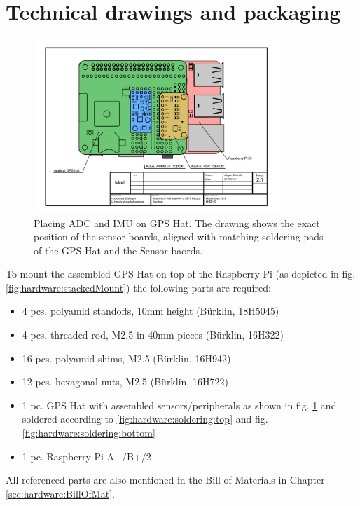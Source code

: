 \section{Technical drawings and packaging}
\label{sec:hardware:techDrawAndPack}

\begin{figure}[H]
    \centering
    \includegraphics[angle=90,width=0.83\textwidth]{fig/ch-rpi-hardware/A4_tech_draw_topview_sensor_mountingPositions}
    \caption[Placing ADC and IMU on GPS Hat]{Placing ADC and IMU on GPS Hat. The drawing shows the exact position of the sensor boards, aligned with matching soldering pads of the GPS Hat and the Sensor baords.}
    \label{fig:hardware:sensorMount}
\end{figure}

To mount the assembled GPS Hat on top of the Raspberry Pi (as depicted in fig. \ref{fig:hardware:stackedMount}) the following parts are required:
\begin{itemize}
	\item 4 pcs. polyamid standoffs, 10mm height (B\"urklin, 18H5045)
	\item 4 pcs. threaded rod, M2.5 in 40mm pieces (B\"urklin, 16H322)
	\item 16 pcs. polyamid shims, M2.5 (B\"urklin, 16H942)
	\item 12 pcs. hexagonal nuts, M2.5 (B\"urklin, 16H722)
	\item 1 pc. GPS Hat with assembled sensors/peripherals as shown in fig. \ref{fig:hardware:sensorMount} and soldered according to \ref{fig:hardware:soldering:top} and fig. \ref{fig:hardware:soldering:bottom}
	\item 1 pc. Raspberry Pi A+/B+/2
\end{itemize}
All referenced parts are also mentioned in the Bill of Materials in Chapter \ref{sec:hardware:BillOfMat}.

